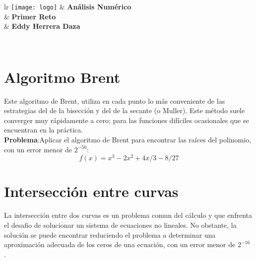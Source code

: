\documentclass[12pt,letterpaper]{exam}
\newcommand{\base}[1]{\underline{\hspace{#1}}}
\newcommand{\uni}{Análisis Numérico}
\newcommand{\fac}{Primer Reto }
\newcommand{\dep}{Eddy Herrera Daza }
\begin{document}
	
\begin{tabular}{lr}
     {\texttt{[image: logo]}}
    	& \hspace{0.5 cm} {\textbf{\uni}} \\	
    	& {\textbf{\fac}} \\
    	& {\textbf{\dep}} 
\end{tabular}\\
\base{19.5cm}







\section{Algoritmo Brent }
Este algoritmo de Brent, utiliza en cada punto lo más conveniente de las estrategias del de la bisección y del de la secante (o Muller). Este método suele converger muy rápidamente a cero; para las funciones difíciles ocasionales que se encuentran en la práctica.\\
\textbf{Problema}:Aplicar el algoritmo de Brent para encontrar las raíces del polinomio, con un error menor de $2^{-50}$:
\begin{equation}
	f(x)=x^{3}-2x^{2}+4x/3-8/27
\end{equation}

\section{Intersección entre curvas}
La intersección entre dos curvas es un problema comun del cálculo y que enfrenta el desafio de solucionar un sistema de ecuaciones no lineales. No obstante, la solución se puede encontrar reduciendo el problema a determinar una aproximación adecuada de los ceros de una ecuación, con un error menor de $2^{-16}$ .\\
\end{document}
